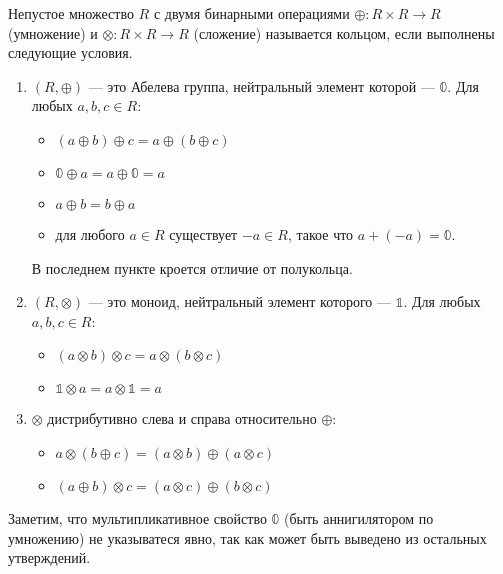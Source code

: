 \begin{definition}[Кольцо]

Непустое множество $R$ с двумя бинарными операциями $\oplus\colon R \times R \to R$ (умножение) и $\otimes \colon R \times R \to R$ (сложение) называется кольцом, если выполнены следующие условия.
\begin{enumerate}

\item $(R, \oplus)$ --- это Абелева группа, нейтральный элемент которой --- $\mathbb{0}$. Для любых $a,b,c \in R$:
\begin{itemize}
	\item $(a \oplus b) \oplus c = a \oplus (b \oplus c)$
	\item $\mathbb{0} \oplus a = a \oplus \mathbb{0} = a$
	\item $a \oplus b = b \oplus a$
	\item для любого $a \in R$ существует $-a \in  R$, такое что $a + (-a) = \mathbb{0}$.
\end{itemize}
В последнем пункте кроется отличие от полукольца.

\item $(R, \otimes)$ --- это моноид, нейтральный элемент которого --- $\mathbb{1}$. Для любых $a,b,c \in R$:
\begin{itemize}
	\item $(a \otimes b) \otimes c = a \otimes (b \otimes c)$
    \item $\mathbb{1} \otimes a = a \otimes \mathbb{1} = a$
\end{itemize}

\item $\otimes$ дистрибутивно слева и справа относительно $\oplus$:
\begin{itemize}
	\item $a \otimes (b \oplus c) = (a \otimes b) \oplus (a \otimes c)$
    \item $(a \oplus b) \otimes c = (a \otimes c) \oplus (b \otimes c)$
\end{itemize}

\end{enumerate}

Заметим, что мультипликативное свойство $\mathbb{0}$ (быть аннигилятором по умножению) не указыватеся явно, так как может быть выведено из остальных утверждений.

\end{definition}



